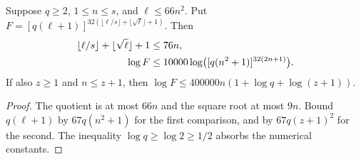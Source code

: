 \begin{lemma}
    \label{thm:aklv_quadratic_degree_log_rank}
    \leanok
    Suppose $q\ge2$, $1\le n\le s$, and $\ell\le66n^2$.
    Put $F=[q(\ell+1)]^{32(\lfloor\ell/s\rfloor+\lfloor\sqrt\ell\rfloor+1)}$.
    Then
    \begin{align*}
        \lfloor\ell/s\rfloor+\lfloor\sqrt\ell\rfloor+1 & \le76n,\notag                                  \\
        \log F                                         & \le10000\log\bigl([q(n^2+1)]^{32(2n+1)}\bigr).
    \end{align*}
    If also $z\ge1$ and $n\le z+1$, then
    $\log F\le400000n(1+\log q+\log(z+1))$.
\end{lemma}
\begin{proof}
    \leanok
    The quotient is at most $66n$ and the square root at most $9n$.
    Bound $q(\ell+1)$ by $67q(n^2+1)$ for the first comparison,
    and by $67q(z+1)^2$ for the second. The inequality
    $\log q\ge\log2\ge1/2$ absorbs the numerical constants.
\end{proof}


